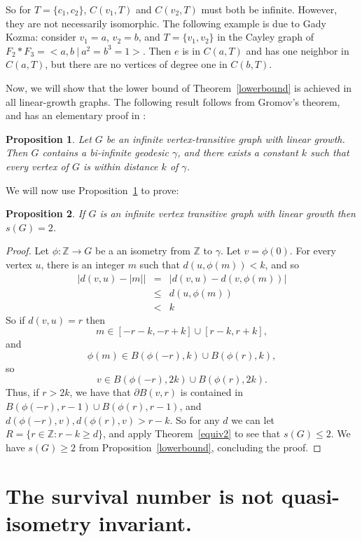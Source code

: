 \documentclass[11pt]{article}
\newtheorem{prop}{Proposition}
\newcommand{\Z}{\mathbb{Z}}
\begin{document}
So for $T = \{c_1, c_2\}$, $C(v_1, T)$ and $C(v_2, T)$ must both be infinite. However, they are not necessarily isomorphic. The following example is due to Gady Kozma: consider $v_1 = a$, $v_2 = b$, and $T = \{v_1, v_2\}$ in the Cayley graph of \mbox{$F_2 * F_3 = <a, b\ |\ a^2= b^3=1>$}. Then $e$ is in $C(a,T)$ and has one neighbor in $C(a,T)$, but there are no vertices of degree one in $C(b,T)$.

Now, we will show that the lower bound of Theorem~\ref{lowerbound} is achieved in all linear-growth graphs. The following result follows from Gromov's theorem, and has an elementary proof in \cite{3caret}:
\begin{prop}
\label{3caret}
Let $G$ be an infinite vertex-transitive graph with linear growth. Then $G$ contains a bi-infinite geodesic $\gamma$, and there exists a constant $k$ such that every vertex of $G$ is within distance $k$ of $\gamma$.
\end{prop}

We will now use Proposition~\ref{3caret} to prove:

\begin{prop} \label{thm:linear} If $G$ is an infinite vertex transitive graph with linear growth then $s(G) = 2$. \end{prop}

\begin{proof} Let $\phi:\Z \rightarrow G$ be a an isometry from $\Z$ to $\gamma$. Let $v = \phi(0)$. For every vertex $u$, there is an integer $m$ such that $d(u,\phi(m))<k$, and so
\begin{eqnarray*}
\bigl|d(v,u) - |m|\bigr| &=& \bigl|d(v,u) - d(v,\phi(m))\bigr| \\
&\leq& d(u,\phi(m))\\
&<& k
\end{eqnarray*}
So if $d(v,u) = r$ then 
$$m \in [-r-k, -r+k] \cup [r-k,r+k],$$ and 
$$\phi(m) \in B(\phi(-r),k) \cup B(\phi(r),k),$$ so 
$$v \in B(\phi(-r),2k) \cup B(\phi(r),2k).$$ 
Thus, if $r > 2k$, we have that $\partial B(v,r)$ is contained in $B(\phi(-r),r-1) \cup B(\phi(r),r-1)$, and $d(\phi(-r), v), d(\phi(r),v) > r-k$. So for any $d$ we can let $R = \{r \in \Z : r-k \geq d\}$, and apply Theorem~\ref{equiv2} to see that $s(G) \leq 2$. We have $s(G) \geq 2$ from Proposition~\ref{lowerbound}, concluding the proof.
\end{proof}


\section{The survival number is not quasi-isometry invariant.}
\label{sec:notinvariant}
\end{document}
